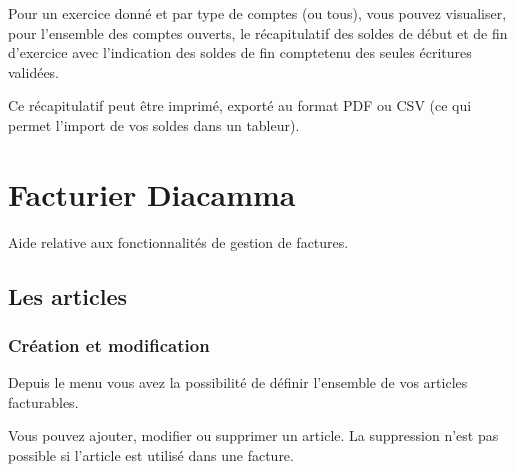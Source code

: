 \documentclass[a4paper,10pt,oneside,french]{sphinxmanual}
\begin{document}
Pour un exercice donné et par type de comptes (ou tous), vous pouvez visualiser, pour l’ensemble des comptes ouverts, le récapitulatif des soldes de début et de fin d’exercice avec l’indication des soldes de fin compte\sphinxhyphen{}tenu des seules écritures validées.

Ce récapitulatif peut être imprimé, exporté au format PDF ou CSV (ce qui permet l’import de vos soldes dans un tableur).


\chapter{Facturier Diacamma}
\label{\detokenize{invoice/index:facturier-diacamma}}\label{\detokenize{invoice/index::doc}}
Aide relative aux fonctionnalités de gestion de factures.


\section{Les articles}
\label{\detokenize{invoice/articles:les-articles}}\label{\detokenize{invoice/articles::doc}}

\subsection{Création et modification}
\label{\detokenize{invoice/articles:creation-et-modification}}
Depuis le menu  vous avez la possibilité de définir l’ensemble de vos articles facturables.

\noindent{}

Vous pouvez ajouter, modifier ou supprimer un article. La suppression n’est pas possible si l’article est utilisé dans une facture.
\end{document}

